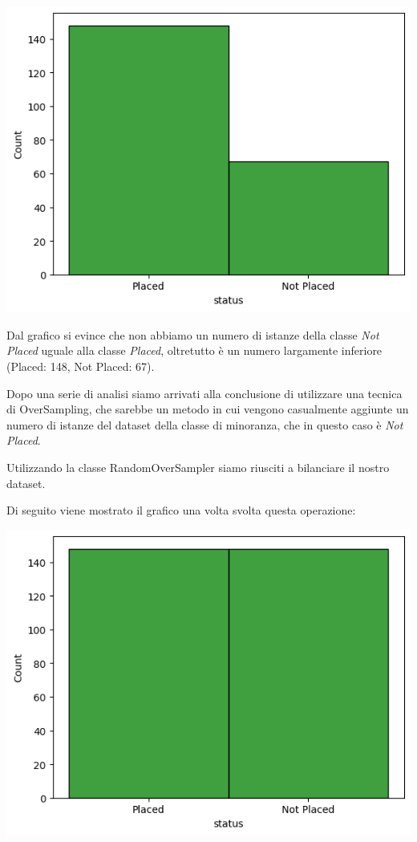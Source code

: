 \documentclass[12pt]{article}
\begin{document}
\begin{center}
    \includegraphics[scale=0.6]{istance_1.png}
\end{center}

Dal grafico si evince che non abbiamo un numero di istanze della classe \textit{Not Placed} uguale alla classe \textit{Placed}, oltretutto è un numero largamente inferiore (Placed: 148, Not Placed: 67).
\par
Dopo una serie di analisi siamo arrivati alla conclusione di utilizzare una tecnica di OverSampling, che sarebbe un metodo in cui vengono casualmente aggiunte un numero di istanze del dataset della classe di minoranza, che in questo caso è \textit{Not Placed}.
\par
Utilizzando la classe RandomOverSampler siamo riusciti a bilanciare il nostro dataset.
\par
Di seguito viene mostrato il grafico una volta svolta questa operazione:

\begin{center}
    \includegraphics[scale=0.6]{istance_2.png}
\end{center}
\end{document}
